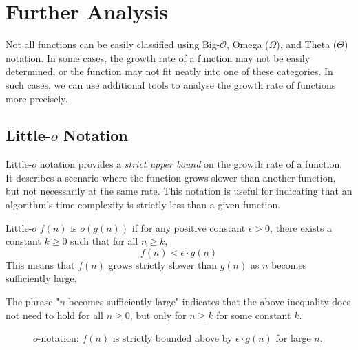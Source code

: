 \section{Further Analysis}
Not all functions can be easily classified using Big-$\mathcal{O}$, Omega ($\Omega$), and Theta ($\Theta$) notation. In some cases, the growth rate of a function may not be easily determined, or the function may not fit neatly into one of these categories. In such cases, we can use additional tools to analyse the growth rate of functions more precisely.

\subsection*{Little-\texorpdfstring{$o$}{o} Notation}
Little-$o$ notation provides a \textit{strict upper bound} on the growth rate of a function. It describes a scenario where the function grows slower than another function, but not necessarily at the same rate. This notation is useful for indicating that an algorithm's time complexity is strictly less than a given function.

\begin{definition}{Little-$o$}\label{def:little_o_notation}
    $f(n)$ is $o(g(n))$ if for any positive constant $\epsilon > 0$, there exists a constant $k \geq 0$ such that for all $n \geq k$,
    \medskip
    \[
    f(n) < \epsilon \cdot g(n)
    \]
    \medskip
    This means that $f(n)$ grows strictly slower than $g(n)$ as $n$ becomes sufficiently large.
    
\end{definition}

The phrase "$n$ becomes sufficiently large" indicates that the above inequality does not need to hold for all $n \geq 0$, but only for $n \geq k$ for some constant $k$.

\begin{figure}[h]
    \centering
    \caption{$o$-notation: $f(n)$ is strictly bounded above by $\epsilon \cdot g(n)$ for large $n$.}
    \label{fig:little_o_notation}
\end{figure}

